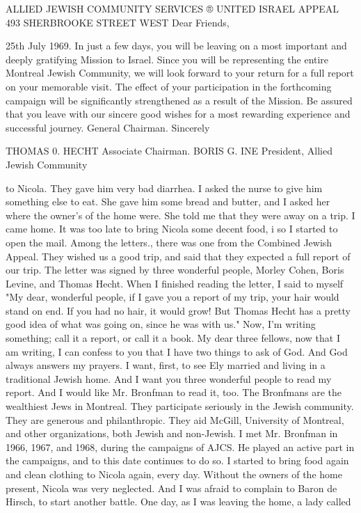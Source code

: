 
ALLIED JEWISH COMMUNITY SERVICES ® UNITED ISRAEL APPEAL 
493 SHERBROOKE STREET WEST 
Dear Friends, 

25th July 1969.
In just a few days, you will be leaving 
on a most important and deeply gratifying Mission to 
Israel.
Since you will be representing the entire 
Montreal Jewish Community, we will look forward to 
your return for a full report on your memorable visit.
The effect of your participation in the 
forthcoming campaign will be significantly strengthened 
as a result of the Mission.
Be assured that you leave 
with our sincere good wishes for a most rewarding 
experience and successful journey.
General Chairman.
Sincerely

THOMAS 0.
HECHT 
Associate Chairman.
BORIS G. INE 
President, 
Allied Jewish Community 

to Nicola.
They gave him very bad diarrhea.
I asked the nurse to 
give him something else to eat.
She gave him some bread and butter, 
and I asked her where the owner's of the home were.
She told me that 
they were away on a trip.
I came home.
It was too late to bring Nicola some decent food, i 
so I started to open the mail.
Among the letters., there was one 
from the Combined Jewish Appeal.
They wished us a good trip, and 
said that they expected a full report of our trip.
The letter was 
signed by three wonderful people, Morley Cohen, Boris Levine, and 
Thomas Hecht.
When I finished reading the letter, I said to myself 
"My dear, wonderful people, if I gave you a report of my trip, your 
hair would stand on end.
If you had no hair, it would grow!
But 
Thomas Hecht has a pretty good idea of what was going on, since he 
was with us."
Now, I'm writing something; call it a report, or call it a book.
My dear three fellows, now that I am writing, I can confess to you 
that I have two things to ask of God.
And God always answers my 
prayers.
I want, first, to see Ely married and living in a traditional Jewish home.
And I want you three wonderful people to read my 
report.
And I would like Mr.
Bronfman to read it, too.
The Bronfmans are the wealthiest Jews in Montreal.
They participate seriously in the Jewish community.
They are generous and philanthropic.
They aid McGill, University of Montreal, and other organizations, both Jewish and non-Jewish.
I met Mr.
Bronfman in 1966, 
1967, and 1968, during the campaigns of AJCS.
He played an active 
part in the campaigns, and to this date continues to do so.
I started to bring food again and clean clothing to Nicola again, 
every day.
Without the owners of the home present, Nicola was very 
neglected.
And I was afraid to complain to Baron de Hirsch, to start 
another battle.
One day, as I was leaving the home, a lady called 

